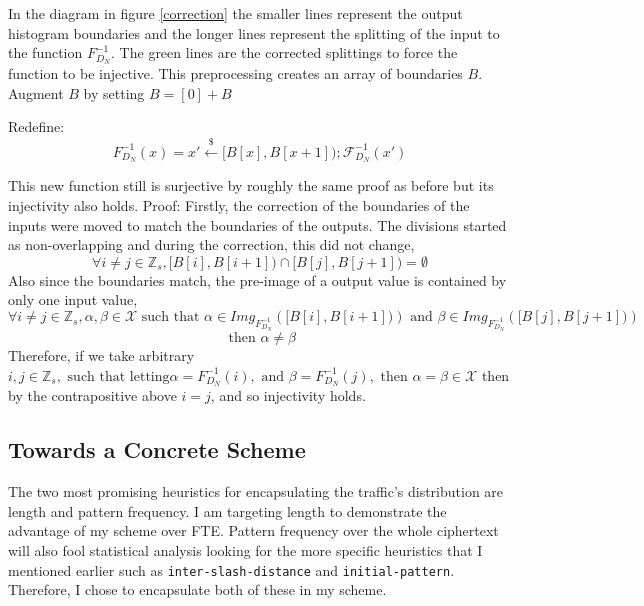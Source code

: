 \documentclass[ %
                    author={Samuel Russell},
                supervisor={Prof. Bogdan Warinschi},
                    degree={MEng},
                     title={Innocuous Ciphertexts},
                  subtitle={The DE-CENSOR Scheme},
                      type={research},
                      year={2018} ]{dissertation}
\begin{document}
In the diagram in figure \ref{correction} the smaller lines represent the output histogram boundaries and the longer lines represent the splitting of the input to the function $F^{-1}_{D_N}$.
The green lines are the corrected splittings to force the function to be injective. This preprocessing creates an array of boundaries $B$. Augment $B$ by setting $B = [0] + B$

Redefine:
$$F^{-1}_{D_N}(x) = x' \xleftarrow{\$} [B[x], B[x+1]); \mathcal{F}^{-1}_{D_N}(x')$$

This new function still is surjective by roughly the same proof as before but its injectivity also holds.
Proof:
Firstly, the correction of the boundaries of the inputs were moved to match the boundaries of the outputs.
The divisions started as non-overlapping and during the correction, this did not change, 
$$\forall i \neq j \in \mathbb{Z}_s, \big[ B[i],B[i+1] \big) \cap \big[ B[j],B[j+1] \big) = \emptyset$$
Also since the boundaries match, the pre-image of a output value is contained by only one input value,
$$ \forall i \neq j \in \mathbb{Z}_s, \alpha,\beta \in \mathcal{X} \text{ such that } \alpha \in Img_{F^{-1}_{D_N}}(\big[ B[i],B[i+1] \big)) \text{ and } \beta \in Img_{F^{-1}_{D_N}}(\big[ B[j],B[j+1] \big))$$
$$\text{ then } \alpha \neq \beta$$
Therefore, if we take arbitrary $i, j \in \mathbb{Z}_s, \text{ such that letting} \alpha = F^{-1}_{D_N}(i), \text{ and } \beta = F^{-1}_{D_N}(j), \text{ then } \alpha = \beta \in \mathcal{X}$ then by the contrapositive above $i=j$, and so injectivity holds.

\subsection{Towards a Concrete Scheme}

The two most promising heuristics for encapsulating the traffic's distribution are length and pattern frequency.
I am targeting length to demonstrate the advantage of my scheme over FTE. Pattern frequency over the whole ciphertext will also fool statistical analysis looking for the more specific heuristics that I mentioned earlier such as \texttt{inter-slash-distance} and \texttt{initial-pattern}.
Therefore, I chose to encapsulate both of these in my scheme. 
\end{document}
